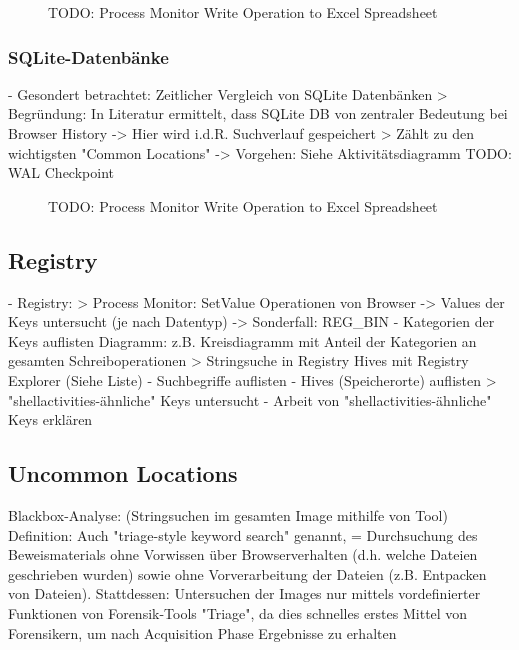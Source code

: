 	\begin{figure}[h!]
		\centering
		\small
		\centerline{\resizebox{\linewidth}{!}{}}
		\caption{TODO: Process Monitor Write Operation to Excel Spreadsheet}
		\label{fig:jes}
	\end{figure}

\subsubsection*{SQLite-Datenbänke}
- Gesondert betrachtet: Zeitlicher Vergleich von SQLite Datenbänken
	> Begründung: In Literatur ermittelt, dass SQLite DB von zentraler Bedeutung bei Browser History -> Hier wird i.d.R. Suchverlauf gespeichert
	> Zählt zu den wichtigsten "Common Locations"
	-> Vorgehen: Siehe Aktivitätsdiagramm
		TODO: WAL Checkpoint
		
\begin{figure}[h!]
	\centering
	\small
	\centerline{\resizebox{\linewidth}{!}{}}
	\caption{TODO: Process Monitor Write Operation to Excel Spreadsheet}
	\label{fig:jes}
\end{figure}

\subsection{Registry}
- Registry:
	> Process Monitor: SetValue Operationen von Browser 
		-> Values der Keys untersucht (je nach Datentyp) -> Sonderfall: REG\_BIN
		- Kategorien der Keys auflisten
		Diagramm: z.B. Kreisdiagramm mit Anteil der Kategorien an gesamten Schreiboperationen
	> Stringsuche in Registry Hives mit Registry Explorer (Siehe Liste)
		- Suchbegriffe auflisten
		- Hives (Speicherorte) auflisten
	> "shellactivities-ähnliche" Keys untersucht
		- Arbeit von "shellactivities-ähnliche" Keys erklären

\subsection{Uncommon Locations}

Blackbox-Analyse: \cite{Bonetti.2014} (Stringsuchen im gesamten Image mithilfe von Tool) 
Definition: Auch "triage-style keyword search" \cite{Horsman.2019} genannt, = Durchsuchung des Beweismaterials ohne 
Vorwissen über Browserverhalten (d.h. welche Dateien geschrieben wurden) sowie ohne Vorverarbeitung der Dateien (z.B. Entpacken von Dateien).
Stattdessen: Untersuchen der Images nur mittels vordefinierter Funktionen von Forensik-Tools
"Triage", da dies schnelles erstes Mittel von Forensikern, um nach Acquisition Phase Ergebnisse zu erhalten

